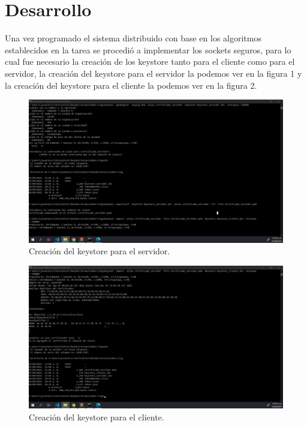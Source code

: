 \documentclass[11pt]{article}
\begin{document}
	\section{Desarrollo}
Una vez programado el sistema distribuido con base en los algoritmos establecidos en la tarea se procedió a implementar los sockets seguros, para lo cual fue necesario la creación de los keystore tanto para el cliente como para el servidor, la creación del keystore para el servidor la podemos ver en la figura 1 y la creación del keystore para el cliente la podemos ver en la figura 2.
		\begin{figure}[H]
			\centering
			\includegraphics[scale=0.34]{resources/certificado_servidor.png}
			\caption{Creación del keystore para el servidor. }\label{fig:picture}
		\end{figure}
		\begin{figure}[H]
			\centering
			\includegraphics[scale=0.34]{resources/certificado_cliente.png}
			\caption{Creación del keystore para el cliente. }\label{fig:picture}
		\end{figure}
\end{document}
